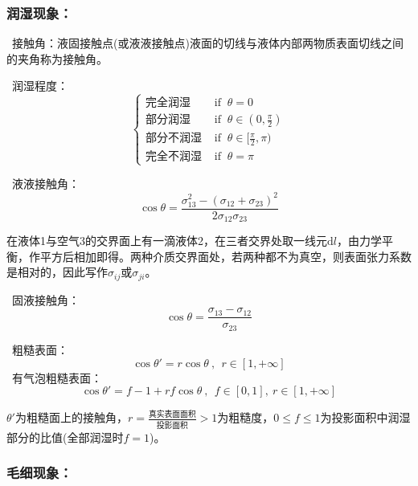 \documentclass[zihao=-4,UTF8]{report}
\begin{document}
\subsubsection{润湿现象：}
\par{}\ 接触角：液固接触点(或液液接触点)液面的切线与液体内部两物质表面切线之间的夹角称为接触角。    \par
{}\  润湿程度：
\begin{equation}
    \begin{cases}
        \text{完全润湿} & \text{ if }\  \theta=0 \\
        \text{部分润湿} & \text{ if }\  \theta \in (0,\frac{\pi}{2} ) \\
        \text{部分不润湿} & \text{ if }\  \theta \in [\frac{\pi }{2},\pi  )\\
        \text{完全不润湿} & \text{ if }\ \theta = \pi
    \end{cases}
\end{equation}   \par
{}\  液液接触角：
\begin{equation}
    \cos\theta = \frac{\sigma_{13}^2 - (\sigma_{12} +\sigma_{23})^2}{2\sigma_{12}\sigma_{23}}
\end{equation} 
{\par\color{gray}\small
在液体1与空气3的交界面上有一滴液体2，在三者交界处取一线元$\mathrm{d}l$，由力学平衡，作平方后相加即得。两种介质交界面处，若两种都不为真空，则表面张力系数是相对的，因此写作$\sigma_{ij}$或$\sigma_{ji}$。
\par} \par
{}\ 固液接触角：
\begin{equation}
    \cos \theta = \frac{\sigma_{13} - \sigma_{12}}{\sigma_{23}}
\end{equation}\par
{}\ 粗糙表面：
\begin{equation}
    \cos \theta' = r\cos\theta\ ,\ \ r \in [1,+\infty]
\end{equation}
\ 有气泡粗糙表面：
\begin{equation}
    \cos \theta' = f-1 + rf\cos\theta\ ,\ \ f \in [0,1],\ r \in [1,+\infty] 
\end{equation}
{\par\color{gray}\small
$\theta'$为粗糙面上的接触角，$r = \frac{\text{真实表面面积}}{\text{投影面积}} >1$为粗糙度，$0\le f\le 1$为投影面积中润湿部分的比值(全部润湿时$f=1$)。
\par}

\subsubsection{毛细现象：}
\end{document}
